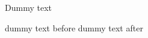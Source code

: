 \documentclass{article}
\begin{document}
Dummy text


dummy text before \prout dummy text after
\end{document}
